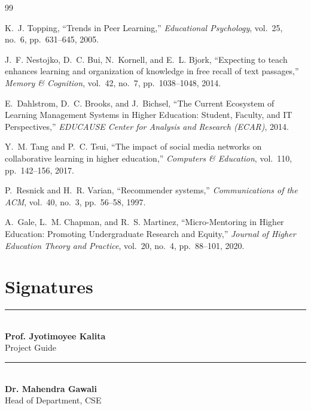 \documentclass[12pt,a4paper]{report}
\newcommand{\GuideName}{Prof. Jyotimoyee Kalita}
\newcommand{\HODName}{Dr. Mahendra Gawali}
\begin{document}
\newpage
\begin{thebibliography}{99}

K.~J. Topping,
``Trends in Peer Learning,''
\textit{Educational Psychology}, vol.~25, no.~6, pp.~631--645, 2005.

J.~F. Nestojko, D.~C. Bui, N.~Kornell, and E.~L. Bjork,
``Expecting to teach enhances learning and organization of knowledge in free recall of text passages,''
\textit{Memory \& Cognition}, vol.~42, no.~7, pp.~1038--1048, 2014.

E.~Dahlstrom, D.~C. Brooks, and J.~Bichsel,
``The Current Ecosystem of Learning Management Systems in Higher Education: Student, Faculty, and IT Perspectives,''
\textit{EDUCAUSE Center for Analysis and Research (ECAR)}, 2014.

Y.~M. Tang and P.~C. Tsui,
``The impact of social media networks on collaborative learning in higher education,''
\textit{Computers \& Education}, vol.~110, pp.~142--156, 2017.

P.~Resnick and H.~R. Varian,
``Recommender systems,''
\textit{Communications of the ACM}, vol.~40, no.~3, pp.~56--58, 1997.

A.~Gale, L.~M. Chapman, and R.~S. Martinez,
``Micro-Mentoring in Higher Education: Promoting Undergraduate Research and Equity,''
\textit{Journal of Higher Education Theory and Practice}, vol.~20, no.~4, pp.~88--101, 2020.

\end{thebibliography}

\newpage
\thispagestyle{fancy}
\section*{Signatures}

\vspace{5cm}

\noindent
\begin{minipage}[t]{0.48\textwidth}
    \centering
    \rule{6.5cm}{0.4pt}\\[0.3cm]
    \textbf{\GuideName}\\[0.15cm]
    Project Guide
\end{minipage}
\hfill
\begin{minipage}[t]{0.48\textwidth}
    \centering
    \rule{6.5cm}{0.4pt}\\[0.3cm]
    \textbf{\HODName}\\[0.15cm]
    Head of Department, CSE
\end{minipage}

\vfill
\end{document}
